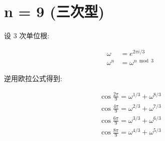 \chapter{n = 9 (三次型)}\label{ch:cos9}

设 3 次单位根:

$$
\begin{aligned}
    ω&= e^{2πi/3}\\
    ω^n&=ω^{n\bmod 3}
\end{aligned}
$$

逆用欧拉公式得到:

$$
\begin{aligned}
    \cos\frac{2π}{9}=ω^{1/3}+ω^{8/3}\\
    \cos\frac{4π}{9}=ω^{2/3}+ω^{7/3}\\
    \cos\frac{6π}{9}=ω^{3/3}+ω^{6/3}\\
    \cos\frac{8π}{9}=ω^{4/3}+ω^{5/3}\\
\end{aligned}
$$